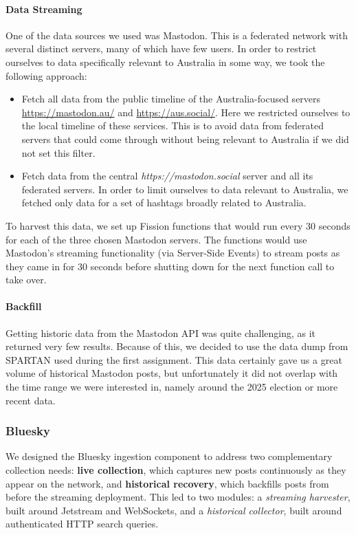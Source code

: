 \paragraph{Data Streaming}
One of the data sources we used was Mastodon. This is a federated network with several distinct servers, many of which have few users. In order to restrict ourselves to data specifically relevant to Australia in some way, we took the following approach:
\begin{itemize}
	\item Fetch all data from the public timeline of the Australia-focused servers \url{https://mastodon.au/} and \url{https://aus.social/}. Here we restricted ourselves to the local timeline of these services. This is to avoid data from federated servers that could come through without being relevant to Australia if we did not set this filter.
	
	\item Fetch data from the central \textit{https://mastodon.social} server and all its federated servers. In order to limit ourselves to data relevant to Australia, we fetched only data for a set of hashtags broadly related to Australia.
\end{itemize}
To harvest this data, we set up Fission functions that would run every 30 seconds for each of the three chosen Mastodon servers. The functions would use Mastodon's streaming functionality (via Server-Side Events) to stream posts as they came in for 30 seconds before shutting down for the next function call to take over.

\paragraph{Backfill}
Getting historic data from the Mastodon API was quite challenging, as it returned very few results. Because of this, we decided to use the data dump from SPARTAN used during the first assignment. This data certainly gave us a great volume of historical Mastodon posts, but unfortunately it did not overlap with the time range we were interested in, namely around the 2025 election or more recent data.

\subsubsection{Bluesky}

We designed the Bluesky ingestion component to address two complementary collection needs: \textbf{live collection}, which captures new posts continuously as they appear on the network, and \textbf{historical recovery}, which backfills posts from before the streaming deployment. This led to two modules: a \textit{streaming harvester}, built around Jetstream and WebSockets, and a \textit{historical collector}, built around authenticated HTTP search queries.
\\


